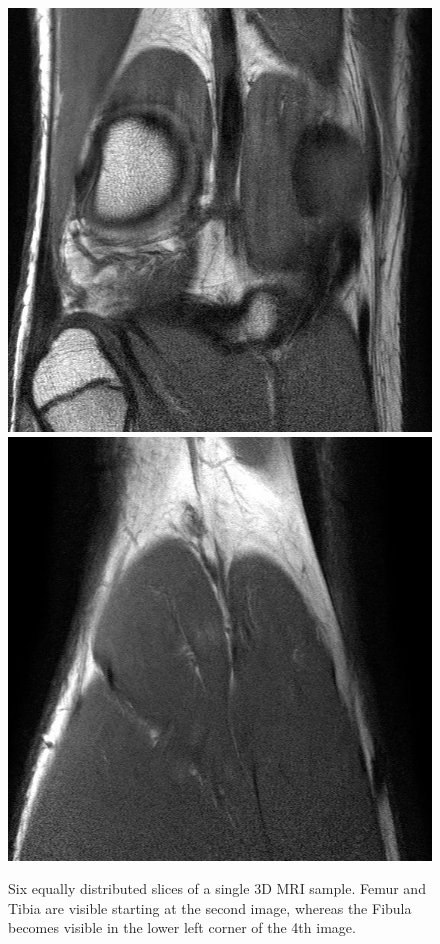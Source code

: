 \begin{figure}[H]
\endminipage\hfill
{}
  \includegraphics[width=\linewidth]{imgs/31.jpg}
\endminipage\hfill
{}%
  \includegraphics[width=\linewidth]{imgs/38.jpg}
\endminipage
\caption{Six equally distributed slices of a single 3D MRI sample. Femur and Tibia are visible starting at the second image, whereas the Fibula becomes visible in the lower left corner of the 4th image.}
\end{figure}

